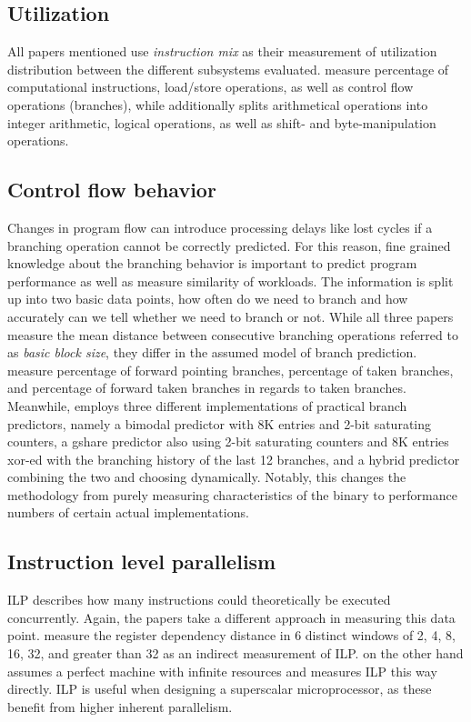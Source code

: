 \documentclass[../bachelor_paper.tex]{subfiles}
\begin{document}
\subsection{Utilization}
All papers mentioned use \emph{instruction mix} as their measurement of utilization distribution between the different subsystems evaluated. \cite{phansalkarMeasuringProgramSimilarity2005,joshiMeasuringBenchmarkSimilarity2006} measure percentage of computational instructions, load/store operations, as well as control flow operations (branches), while \cite{eeckhoutQuantifyingImpactInput} additionally splits arithmetical operations into integer arithmetic, logical operations, as well as shift- and byte-manipulation operations.

\subsection{Control flow behavior}
Changes in program flow can introduce processing delays like lost cycles if a branching operation cannot be correctly predicted. For this reason, fine grained knowledge about the branching behavior is important to predict program performance as well as measure similarity of workloads. The information is split up into two basic data points, how often do we need to branch and how accurately can we tell whether we need to branch or not. While all three papers measure the mean distance between consecutive branching operations referred to as \emph{basic block size}, they differ in the assumed model of branch prediction. \cite{phansalkarMeasuringProgramSimilarity2005,joshiMeasuringBenchmarkSimilarity2006} measure percentage of forward pointing branches, percentage of taken branches, and percentage of forward taken branches in regards to taken branches. Meanwhile, \cite{eeckhoutQuantifyingImpactInput} employs three different implementations of practical branch predictors, namely a bimodal predictor with 8K entries and 2-bit saturating counters, a gshare predictor also using 2-bit saturating counters and 8K entries xor-ed with the branching history of the last 12 branches, and a hybrid predictor combining the two and choosing dynamically. Notably, this changes the methodology from purely measuring characteristics of the binary to performance numbers of certain actual implementations.

\subsection{Instruction level parallelism}
\Acf{ILP} describes how many instructions could theoretically be executed concurrently. Again, the papers take a different approach in measuring this data point. \cite{phansalkarMeasuringProgramSimilarity2005,joshiMeasuringBenchmarkSimilarity2006} measure the register dependency distance in 6 distinct windows of 2, 4, 8, 16, 32, and greater than 32 as an indirect measurement of \ac{ILP}. \cite{eeckhoutQuantifyingImpactInput} on the other hand assumes a perfect machine with infinite resources and measures \ac{ILP} this way directly. \Ac{ILP} is useful when designing a superscalar microprocessor, as these benefit from higher inherent parallelism.
\end{document}

